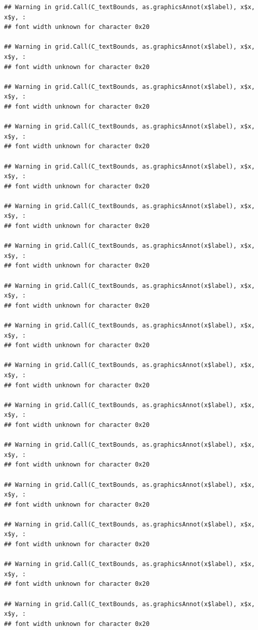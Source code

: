 \documentclass[]{article}
\theoremstyle{definition}
\theoremstyle{definition}
\theoremstyle{definition}
\theoremstyle{remark}
\begin{document}
\begin{verbatim}
## Warning in grid.Call(C_textBounds, as.graphicsAnnot(x$label), x$x, x$y, :
## font width unknown for character 0x20

## Warning in grid.Call(C_textBounds, as.graphicsAnnot(x$label), x$x, x$y, :
## font width unknown for character 0x20

## Warning in grid.Call(C_textBounds, as.graphicsAnnot(x$label), x$x, x$y, :
## font width unknown for character 0x20

## Warning in grid.Call(C_textBounds, as.graphicsAnnot(x$label), x$x, x$y, :
## font width unknown for character 0x20

## Warning in grid.Call(C_textBounds, as.graphicsAnnot(x$label), x$x, x$y, :
## font width unknown for character 0x20

## Warning in grid.Call(C_textBounds, as.graphicsAnnot(x$label), x$x, x$y, :
## font width unknown for character 0x20

## Warning in grid.Call(C_textBounds, as.graphicsAnnot(x$label), x$x, x$y, :
## font width unknown for character 0x20

## Warning in grid.Call(C_textBounds, as.graphicsAnnot(x$label), x$x, x$y, :
## font width unknown for character 0x20

## Warning in grid.Call(C_textBounds, as.graphicsAnnot(x$label), x$x, x$y, :
## font width unknown for character 0x20

## Warning in grid.Call(C_textBounds, as.graphicsAnnot(x$label), x$x, x$y, :
## font width unknown for character 0x20

## Warning in grid.Call(C_textBounds, as.graphicsAnnot(x$label), x$x, x$y, :
## font width unknown for character 0x20

## Warning in grid.Call(C_textBounds, as.graphicsAnnot(x$label), x$x, x$y, :
## font width unknown for character 0x20

## Warning in grid.Call(C_textBounds, as.graphicsAnnot(x$label), x$x, x$y, :
## font width unknown for character 0x20

## Warning in grid.Call(C_textBounds, as.graphicsAnnot(x$label), x$x, x$y, :
## font width unknown for character 0x20

## Warning in grid.Call(C_textBounds, as.graphicsAnnot(x$label), x$x, x$y, :
## font width unknown for character 0x20

## Warning in grid.Call(C_textBounds, as.graphicsAnnot(x$label), x$x, x$y, :
## font width unknown for character 0x20


\end{verbatim}
\end{document}
